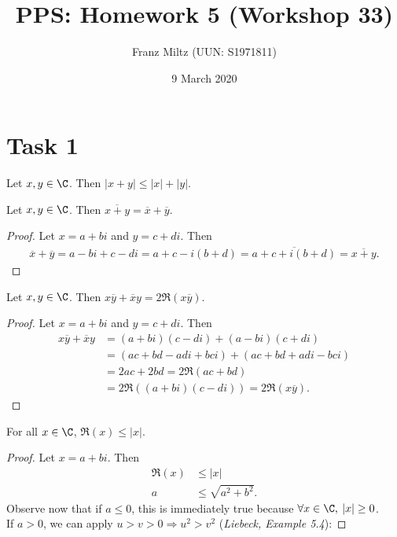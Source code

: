 \documentclass{article}
\title{PPS: Homework 5 (Workshop 33)}
\author{Franz Miltz (UUN: S1971811)}
\date{9 March 2020}
\begin{document}
\maketitle
\section*{Task 1}
\begin{claim}
  Let $x,y\in\C$. Then $|x+y|\leq |x|+|y|$.
\end{claim}
\begin{adjustwidth}{2em}{0pt}
  \begin{lemma}
    \label{l1}
    Let $x,y\in\C$. Then $\overline{x+y}=\overline{x}+\overline{y}$.
  \end{lemma}
  \begin{proof}
    Let $x=a+bi$ and $y=c+di$. Then
    \begin{align*}
      \overline{x}+\overline{y}=a-bi+c-di=a+c-i(b+d)=\overline{a+c+i(b+d)}=\overline{x+y}.
    \end{align*}
  \end{proof}
  \begin{lemma}
    \label{l2}
    Let $x,y\in\C$. Then $x\overline{y}+\overline{x}y=2\Re({x\overline{y}})$.
  \end{lemma}
  \begin{proof}
    Let $x=a+bi$ and $y=c+di$. Then
    \begin{align*}
      x\overline{y}+\overline{x}y & =(a+bi)(c-di)+(a-bi)(c+di)           \\
                          & =(ac+bd-adi+bci)+(ac+bd+adi-bci)     \\
                          & =2ac+2bd=2\Re(ac+bd)                 \\
                          & =2\Re((a+bi)(c-di))=2\Re(x\overline{y}).
    \end{align*}
  \end{proof}
  \begin{lemma}
    \label{l3}
    For all $x\in\C$, $\Re(x)\leq|x|$.
  \end{lemma}
  \begin{proof}
    Let $x=a+bi$. Then
    \begin{align*}
      \Re(x) & \leq|x|              \\
      a      & \leq \sqrt{a^2+b^2}.
    \end{align*}
    Observe now that if $a\leq0$, this is immediately true because $\forall x\in\C,\:|x|\geq 0$.\\
    If $a>0$, we can apply $u>v>0\Rightarrow u^2>v^2$ (\emph{Liebeck, Example 5.4}):

\end{proof}
\end{adjustwidth}
\end{document}
